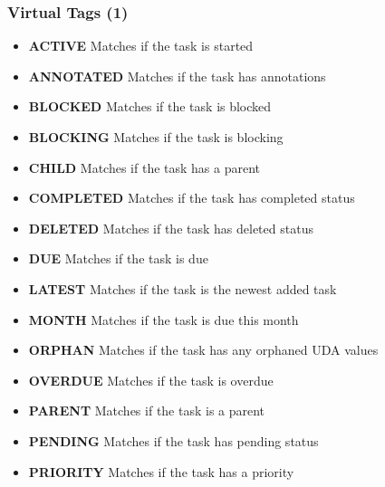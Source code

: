 \documentclass[t,handout]{beamer}
\begin{document}
\begin{frame}[fragile]\frametitle{Virtual Tags (1)}
    \begin{itemize}
        \item \textbf{ACTIVE}       Matches if the task is started
        \item \textbf{ANNOTATED}    Matches if the task has annotations
        \item \textbf{BLOCKED}      Matches if the task is blocked
        \item \textbf{BLOCKING}     Matches if the task is blocking
        \item \textbf{CHILD}        Matches if the task has a parent
        \item \textbf{COMPLETED}    Matches if the task has completed status
        \item \textbf{DELETED}      Matches if the task has deleted status
        \item \textbf{DUE}          Matches if the task is due
        \item \textbf{LATEST}       Matches if the task is the newest added task
        \item \textbf{MONTH}        Matches if the task is due this month
        \item \textbf{ORPHAN}       Matches if the task has any orphaned UDA values
        \item \textbf{OVERDUE}      Matches if the task is overdue
        \item \textbf{PARENT}       Matches if the task is a parent
        \item \textbf{PENDING}      Matches if the task has pending status
        \item \textbf{PRIORITY}     Matches if the task has a priority
    \end{itemize}
\end{frame}
\end{document}
